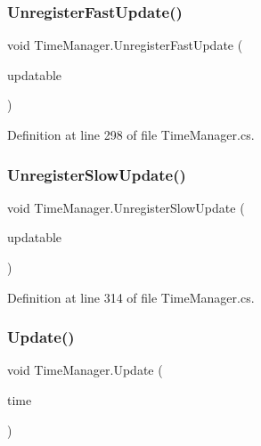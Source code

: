 \mbox{\label{class_time_manager_ad7bb3e065a799ce4110c378d9681eac7}} 
\subsubsection{\texorpdfstring{Unregister\+Fast\+Update()}{UnregisterFastUpdate()}}
{\footnotesize\ttfamily void Time\+Manager.\+Unregister\+Fast\+Update (\begin{DoxyParamCaption}\item[{\hyperlink{interface_i_updatable}{I\+Updatable}}]{updatable }\end{DoxyParamCaption})}



Definition at line 298 of file Time\+Manager.\+cs.

\mbox{\label{class_time_manager_a2b41968cd3169bfc3a7a232da307f57d}} 
\subsubsection{\texorpdfstring{Unregister\+Slow\+Update()}{UnregisterSlowUpdate()}}
{\footnotesize\ttfamily void Time\+Manager.\+Unregister\+Slow\+Update (\begin{DoxyParamCaption}\item[{\hyperlink{interface_i_updatable}{I\+Updatable}}]{updatable }\end{DoxyParamCaption})}



Definition at line 314 of file Time\+Manager.\+cs.

\mbox{\label{class_time_manager_a981b6152006a85774eae414e5cfac46c}} 
\subsubsection{\texorpdfstring{Update()}{Update()}}
{\footnotesize\ttfamily void Time\+Manager.\+Update (\begin{DoxyParamCaption}\item[{float}]{time }\end{DoxyParamCaption})}



